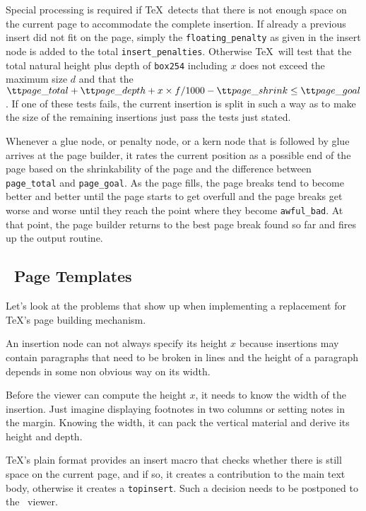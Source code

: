 Special processing is required if \TeX\ detects that there is not enough space on
the current page to accommodate the complete insertion.
If already a previous insert did not fit on the page, simply the {\tt floating\_penalty}
as given in the insert node is added to the total {\tt insert\_penalties}.
Otherwise \TeX\ will test that the total natural height plus depth of {\tt box254} 
including $x$ does not exceed the maximum size $d$ and that the 
${\tt page\_total} + {\tt page\_depth} + x\times f/1000 - {\tt page\_shrink} \le {\tt page\_goal}$.
If one of these tests fails, the current insertion
is split in such a way as to make the size of the remaining insertions just pass the tests
just stated.

Whenever a glue node, or penalty node, or a kern node that is followed by glue arrives
at the page builder, it rates the current position as a possible end of the page based on
the shrinkability of the page and the difference between {\tt page\_total} and {\tt page\_goal}.
As the page fills, the page breaks tend to become better and better until the
page starts to get overfull and the page breaks get worse and worse until
they reach the point where they become {\tt awful\_bad}. At that point,
the page builder returns to the best page break found so far and fires up the 
output routine.


\subsection{\HINT\ Page Templates}
Let's look at the problems that show up when implementing a replacement for \TeX's
page building mechanism.

\enumerate
\item 
An insertion node can not always specify its height $x$ because insertions may contain paragraphs that need
to be broken in lines and the height of a paragraph depends in some non obvious way on
its width. 

\item 
Before the viewer can compute the height $x$, it needs to know the width of the insertion. Just imagine
displaying footnotes in two columns or setting notes in the margin. Knowing the width, it
can pack the vertical material and derive its height and depth.

\item
\TeX's plain format provides an insert macro that checks whether there is still space
on the current page, and if so, it creates a contribution to the main text body, otherwise it
creates a {\tt topinsert}. Such a decision needs to be postponed to the \HINT\ viewer.

